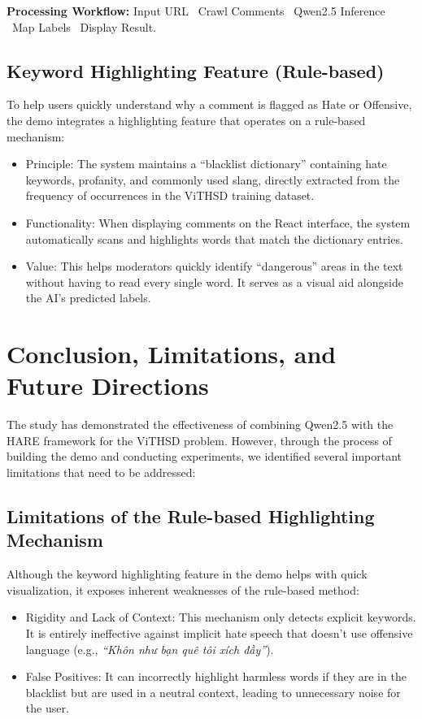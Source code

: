 \documentclass[11pt]{article}
\begin{document}
\textbf{Processing Workflow:}
Input URL \textrightarrow\ Crawl Comments \textrightarrow\ Qwen2.5 Inference \textrightarrow\ Map Labels \textrightarrow\ Display Result.

\subsection{Keyword Highlighting Feature (Rule-based)}
To help users quickly understand why a comment is flagged as Hate or Offensive, the demo
integrates a highlighting feature that operates on a rule-based mechanism:
\begin{itemize}[leftmargin=*]
\item Principle: The system maintains a ``blacklist dictionary'' containing hate keywords,
profanity, and commonly used slang, directly extracted from the frequency of
occurrences in the ViTHSD training dataset.
\item Functionality: When displaying comments on the React interface, the system
automatically scans and highlights words that match the dictionary entries.
\item Value: This helps moderators quickly identify ``dangerous'' areas in the text without
having to read every single word. It serves as a visual aid alongside the AI’s predicted
labels.
\end{itemize}

\section{Conclusion, Limitations, and Future Directions}
The study has demonstrated the effectiveness of combining Qwen2.5 with the HARE
framework for the ViTHSD problem. However, through the process of building the demo and
conducting experiments, we identified several important limitations that need to be
addressed:

\subsection{Limitations of the Rule-based Highlighting Mechanism}
Although the keyword highlighting feature in the demo helps with quick visualization, it
exposes inherent weaknesses of the rule-based method:
\begin{itemize}[leftmargin=*]
\item Rigidity and Lack of Context: This mechanism only detects explicit keywords. It is
entirely ineffective against implicit hate speech that doesn’t use offensive language
(e.g., \foreignlanguage{vietnamese}{\textit{``Khôn như bạn quê tôi xích đầy''}}).
\item False Positives: It can incorrectly highlight harmless words if they are in the blacklist
but are used in a neutral context, leading to unnecessary noise for the user.
\end{itemize}
\end{document}
